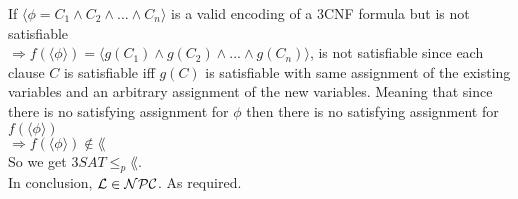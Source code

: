 If $\langle \phi = C_1 \wedge C_2 \wedge ... \wedge C_n \rangle$ is a valid encoding of a 3CNF formula but is not satisfiable \\
$\Rightarrow f(\langle \phi \rangle) = \langle g(C_1) \wedge g(C_2) \wedge ... \wedge g(C_n) \rangle$,
is not satisfiable since each clause $C$ is satisfiable iff $g(C)$ is satisfiable with same assignment of the
existing variables and an arbitrary assignment of the new variables. Meaning that since there is no satisfying assignment
for $\phi$ then there is no satisfying assignment for $f(\langle \phi \rangle)$  \\
$\Rightarrow f(\langle \phi \rangle) \notin \lang$ \\

So we get \underline{$3SAT \leq_p \lang$}. \\
In conclusion, $\mathcal{L} \in \mathcal{N}\mathcal{P}\mathcal{C}$. As required.

